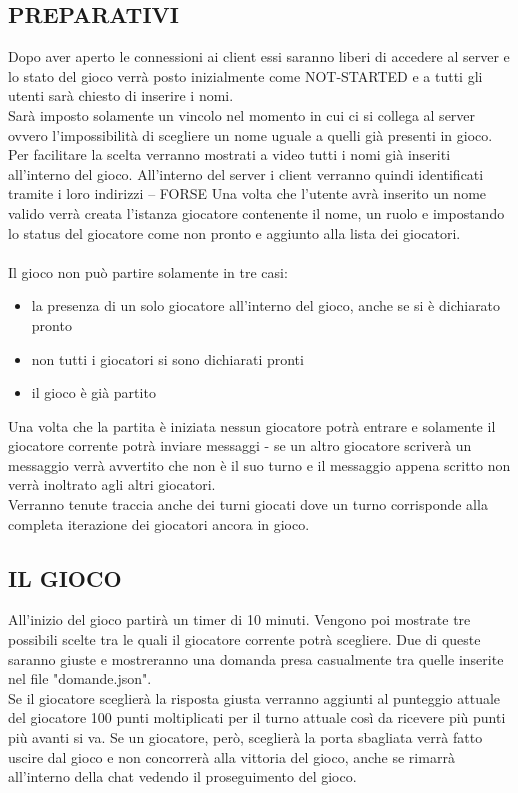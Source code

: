 \documentclass[a4paper,12pt]{report}
\begin{document}
\subsection{PREPARATIVI}
Dopo aver aperto le connessioni ai client essi saranno liberi di accedere al server e lo stato del gioco verrà posto inizialmente come NOT-STARTED e a tutti gli utenti sarà chiesto di inserire i nomi.\\
Sarà imposto solamente un vincolo nel momento in cui ci si collega al server ovvero l'impossibilità di scegliere un nome uguale a quelli già presenti in gioco.
Per facilitare la scelta verranno mostrati a video tutti i nomi già inseriti all'interno del gioco.
All'interno del server i client verranno quindi identificati tramite i loro indirizzi -- FORSE 
Una volta che l'utente avrà inserito un nome valido verrà creata l'istanza giocatore contenente il nome, un ruolo e impostando lo status del giocatore come non pronto e aggiunto alla lista dei giocatori. \\
\\
Il gioco non può partire solamente in tre casi:
\begin{itemize}
	\item la presenza di un solo giocatore all'interno del gioco, anche se si è dichiarato pronto
	\item non tutti i giocatori si sono dichiarati pronti
	\item il gioco è già partito
\end{itemize}
Una volta che la partita è iniziata nessun giocatore potrà entrare e solamente il giocatore corrente potrà inviare messaggi - se un altro giocatore scriverà un messaggio verrà avvertito che non è il suo turno e il messaggio appena scritto non verrà inoltrato agli altri giocatori.\\

Verranno tenute traccia anche dei turni giocati dove un turno corrisponde alla completa iterazione dei giocatori ancora in gioco.
\subsection{IL GIOCO}
All'inizio del gioco partirà un timer di 10 minuti.
Vengono poi mostrate tre possibili scelte tra le quali il giocatore corrente potrà scegliere. Due di queste saranno giuste e mostreranno una domanda presa casualmente tra quelle inserite nel file "domande.json".\\
Se il giocatore sceglierà la risposta giusta verranno aggiunti al punteggio attuale del giocatore 100 punti moltiplicati per il turno attuale così da ricevere più punti più avanti si va.
Se un giocatore, però, sceglierà la porta sbagliata verrà fatto uscire dal gioco e non concorrerà alla vittoria del gioco, anche se rimarrà all'interno della chat vedendo il proseguimento del gioco.\\
\end{document}
